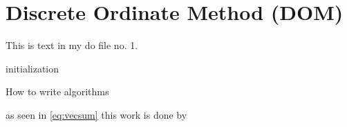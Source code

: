 %

\section{Discrete Ordinate Method (DOM)}
\label{ch:DOM}

This is text in my do file no. 1.


\begin{center}
\begin{algorithm}[H]
 \SetAlgoLined
 initialization\;
 \caption{How to write algorithms}
\end{algorithm}
\end{center}

as seen in \ref{eq:vecsum} this work is done by \cite{Hsu201239,Titarev20071446}

%
%

%
